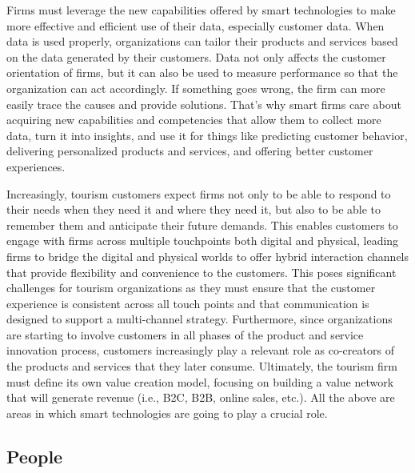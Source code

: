 \documentclass[
  letterpaper,
  DIV=11,
  numbers=noendperiod]{scrreprt}
\begin{document}
Firms must leverage the new capabilities offered by smart technologies
to make more effective and efficient use of their data, especially
customer data. When data is used properly, organizations can tailor
their products and services based on the data generated by their
customers. Data not only affects the customer orientation of firms, but
it can also be used to measure performance so that the organization can
act accordingly. If something goes wrong, the firm can more easily trace
the causes and provide solutions. That's why smart firms care about
acquiring new capabilities and competencies that allow them to collect
more data, turn it into insights, and use it for things like predicting
customer behavior, delivering personalized products and services, and
offering better customer experiences.

Increasingly, tourism customers expect firms not only to be able to
respond to their needs when they need it and where they need it, but
also to be able to remember them and anticipate their future demands.
This enables customers to engage with firms across multiple touchpoints
both digital and physical, leading firms to bridge the digital and
physical worlds to offer hybrid interaction channels that provide
flexibility and convenience to the customers. This poses significant
challenges for tourism organizations as they must ensure that the
customer experience is consistent across all touch points and that
communication is designed to support a multi-channel strategy.
Furthermore, since organizations are starting to involve customers in
all phases of the product and service innovation process, customers
increasingly play a relevant role as co-creators of the products and
services that they later consume. Ultimately, the tourism firm must
define its own value creation model, focusing on building a value
network that will generate revenue (i.e., B2C, B2B, online sales, etc.).
All the above are areas in which smart technologies are going to play a
crucial role.

\hypertarget{people-1}{%
\subsection{People}\label{people-1}}
\end{document}
